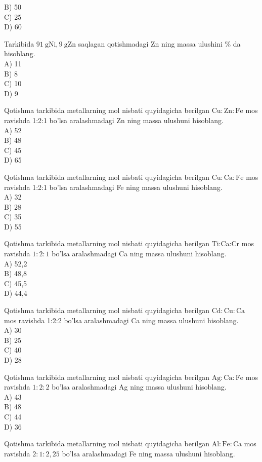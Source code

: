 B) 50\\
C) 25\\
D) 60
  \item Tarkibida $91 \mathrm{~g} \mathrm{Ni}, 9 \mathrm{~g} \mathrm{Zn}$ saqlagan qotishmadagi Zn ning massa ulushini \% da hisoblang.\\
A) 11\\
B) 8\\
C) 10\\
D) 9
  \item Qotishma tarkibida metallarning mol nisbati quyidagicha berilgan $\mathrm{Cu}: \mathrm{Zn}: \mathrm{Fe}$ mos ravishda 1:2:1 bo'lsa aralashmadagi Zn ning massa ulushuni hisoblang.\\
A) 52\\
B) 48\\
C) 45\\
D) 65
  \item Qotishma tarkibida metallarning mol nisbati quyidagicha berilgan $\mathrm{Cu}: \mathrm{Ca}: \mathrm{Fe}$ mos ravishda 1:2:1 bo'lsa aralashmadagi Fe ning massa ulushuni hisoblang.\\
A) 32\\
B) 28\\
C) 35\\
D) 55
  \item Qotishma tarkibida metallarning mol nisbati quyidagicha berilgan Ti:Ca:Cr mos ravishda $1: 2: 1$ bo'lsa aralashmadagi Ca ning massa ulushuni hisoblang.\\
A) 52,2\\
B) 48,8\\
C) 45,5\\
D) 44,4
  \item Qotishma tarkibida metallarning mol nisbati quyidagicha berilgan $\mathrm{Cd}: \mathrm{Cu}: \mathrm{Ca}$ mos ravishda 1:2:2 bo'lsa aralashmadagi Ca ning massa ulushuni hisoblang.\\
A) 30\\
B) 25\\
C) 40\\
D) 28
  \item Qotishma tarkibida metallarning mol nisbati quyidagicha berilgan $\mathrm{Ag}: \mathrm{Ca}: \mathrm{Fe}$ mos ravishda $1: 2: 2$ bo'lsa aralashmadagi Ag ning massa ulushuni hisoblang.\\
A) 43\\
B) 48\\
C) 44\\
D) 36
  \item Qotishma tarkibida metallarning mol nisbati quyidagicha berilgan $\mathrm{Al}: \mathrm{Fe}: \mathrm{Ca}$ mos ravishda $2: 1: 2,25$ bo'lsa aralashmadagi Fe ning massa ulushuni hisoblang.\\
